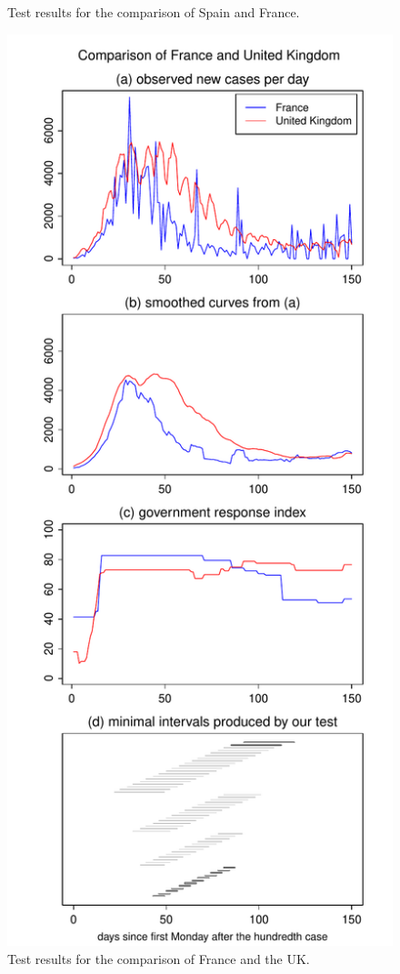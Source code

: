 \documentclass[a4paper,12pt]{article}
\numberwithin{equation}{section}
\begin{document}
\begin{figure}[h!]
\begin{minipage}[t]{0.49\textwidth}
\caption{Test results for the comparison of Spain and France.}
\end{minipage}
\hspace{0.25cm}
\begin{minipage}[t]{0.49\textwidth}
\includegraphics[width=\textwidth]{plots/FRA_vs_GBR_Monday}
\caption{Test results for the comparison of France and the UK.}\label{fig:France:UK}
\end{minipage}
\end{figure}
\end{document}
